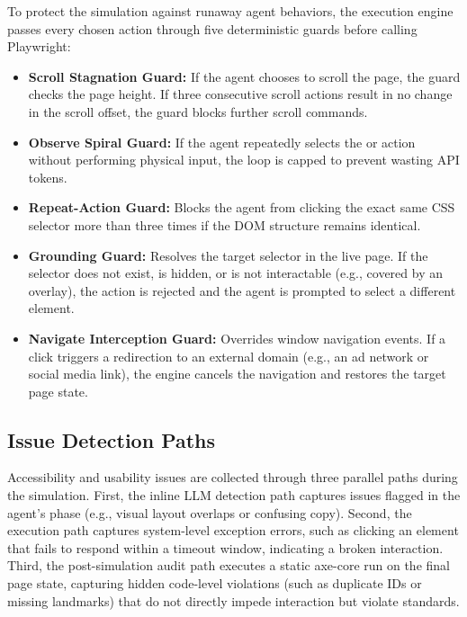 To protect the simulation against runaway agent behaviors, the execution engine passes every chosen action through five deterministic guards before calling Playwright:
\begin{itemize}
    \item \textbf{Scroll Stagnation Guard:} If the agent chooses to scroll the page, the guard checks the page height. If three consecutive scroll actions result in no change in the scroll offset, the guard blocks further scroll commands.
    \item \textbf{Observe Spiral Guard:} If the agent repeatedly selects the  or  action without performing physical input, the loop is capped to prevent wasting API tokens.
    \item \textbf{Repeat-Action Guard:} Blocks the agent from clicking the exact same CSS selector more than three times if the DOM structure remains identical.
    \item \textbf{Grounding Guard:} Resolves the target selector in the live page. If the selector does not exist, is hidden, or is not interactable (e.g., covered by an overlay), the action is rejected and the agent is prompted to select a different element.
    \item \textbf{Navigate Interception Guard:} Overrides window navigation events. If a click triggers a redirection to an external domain (e.g., an ad network or social media link), the engine cancels the navigation and restores the target page state.
\end{itemize}

\subsection{Issue Detection Paths}
\label{sec:issue-detection}

Accessibility and usability issues are collected through three parallel paths during the simulation. First, the inline LLM detection path captures issues flagged in the agent's  phase (e.g., visual layout overlaps or confusing copy). Second, the execution path captures system-level exception errors, such as clicking an element that fails to respond within a timeout window, indicating a broken interaction. Third, the post-simulation audit path executes a static axe-core run on the final page state, capturing hidden code-level violations (such as duplicate IDs or missing landmarks) that do not directly impede interaction but violate standards.



